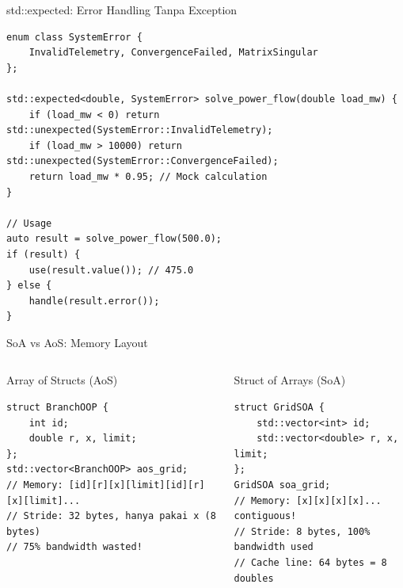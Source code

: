 \documentclass[aspectratio=169,10pt]{beamer}
\begin{document}
\begin{frame}[fragile]{std::expected: Error Handling Tanpa Exception}
  \begin{verbatim}
enum class SystemError {
    InvalidTelemetry, ConvergenceFailed, MatrixSingular
};

std::expected<double, SystemError> solve_power_flow(double load_mw) {
    if (load_mw < 0) return std::unexpected(SystemError::InvalidTelemetry);
    if (load_mw > 10000) return std::unexpected(SystemError::ConvergenceFailed);
    return load_mw * 0.95; // Mock calculation
}

// Usage
auto result = solve_power_flow(500.0);
if (result) {
    use(result.value()); // 475.0
} else {
    handle(result.error());
}
  \end{verbatim}
\end{frame}

\begin{frame}[fragile]{SoA vs AoS: Memory Layout}
  \begin{columns}[T]
    \begin{block}{Array of Structs (AoS)}
      \begin{verbatim}
struct BranchOOP {
    int id;
    double r, x, limit;
};
std::vector<BranchOOP> aos_grid;
// Memory: [id][r][x][limit][id][r][x][limit]...
// Stride: 32 bytes, hanya pakai x (8 bytes)
// 75% bandwidth wasted!
      \end{verbatim}
    \end{block}
    \begin{block}{Struct of Arrays (SoA)}
      \begin{verbatim}
struct GridSOA {
    std::vector<int> id;
    std::vector<double> r, x, limit;
};
GridSOA soa_grid;
// Memory: [x][x][x][x]... contiguous!
// Stride: 8 bytes, 100% bandwidth used
// Cache line: 64 bytes = 8 doubles
      \end{verbatim}
    \end{block}
  \end{columns}
\end{frame}
\end{document}
